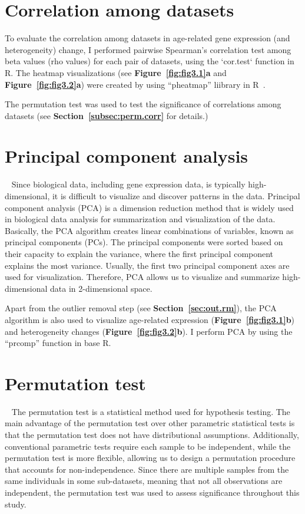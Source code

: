 \section{Correlation among datasets}
To evaluate the correlation among datasets in age-related gene expression (and heterogeneity) change, 
I performed pairwise Spearman's correlation test among beta values (rho values) for each pair of datasets, using the `cor.test` function in R.
The heatmap visualizations (see \textbf{Figure~\ref{fig:fig3.1}a} and \textbf{Figure~\ref{fig:fig3.2}a}) were created by using ``pheatmap'' liibrary in R~\cite{Kolde2019}.

The permutation test was used to test the significance of correlations among datasets (see \textbf{Section~\ref{subsec:perm.corr}} for details.)

\section{Principal component analysis}~\label{sec:pca}
Since biological data, including gene expression data, is typically high-dimensional, it is difficult to visualize and discover patterns in the data.
Principal component analysis (PCA) is a dimension reduction method that is widely used in biological data analysis for summarization and visualization of the data.
Basically, the PCA algorithm creates linear combinations of variables, known as principal components (PCs). 
The principal components were sorted based on their capacity to explain the variance, where the first principal component explains the most variance.
Usually, the first two principal component axes are used for visualization. 
Therefore, PCA allows us to visualize and summarize high-dimensional data in 2-dimensional space.

Apart from the outlier removal step (see \textbf{Section~\ref{sec:out.rm}}), 
the PCA algorithm is also used to visualize age-related expression (\textbf{Figure~\ref{fig:fig3.1}b}) and heterogeneity changes (\textbf{Figure~\ref{fig:fig3.2}b}).
I perform PCA by using the ``prcomp'' function in base R.

\section{Permutation test}~\label{sec:perm}
The permutation test is a statistical method used for hypothesis testing. 
The main advantage of the permutation test over other parametric statistical tests is that the permutation test does not have distributional assumptions.
Additionally, conventional parametric tests require each sample to be independent, 
while the permutation test is more flexible, allowing us to design a permutation procedure that accounts for non-independence.
Since there are multiple samples from the same individuals in some sub-datasets, meaning that not all observations are independent, 
the permutation test was used to assess significance throughout this study.

